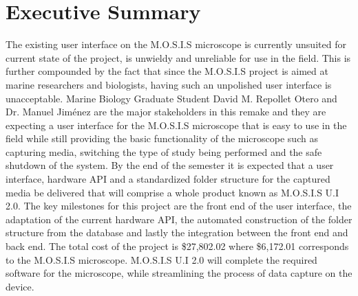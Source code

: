  \section*{Executive Summary}
 The existing user interface on the M.O.S.I.S microscope is currently unsuited for current state of the project, is unwieldy and unreliable for use in the field. This is further compounded by the fact that since the M.O.S.I.S project is aimed at marine researchers and biologists, having such an unpolished user interface is unacceptable. Marine Biology Graduate Student David M. Repollet Otero and Dr. Manuel Jiménez are the major stakeholders in this remake and they are expecting a user interface for the M.O.S.I.S microscope that is easy to use in the field while still providing the basic functionality of the microscope such as capturing media, switching the type of study being performed and the safe shutdown of the system. By the end of the semester it is expected that a user interface, hardware API and a standardized folder structure for the captured media be delivered that will comprise a whole product known as M.O.S.I.S U.I  2.0. The key milestones for this project are the front end of the user interface, the adaptation of the current hardware API, the automated construction of the folder structure from the database and lastly the integration between the front end and back end. The total cost of the project is \$27,802.02 where \$6,172.01 corresponds to the M.O.S.I.S microscope. M.O.S.I.S U.I 2.0 will complete the required software for the microscope, while streamlining the process of data capture on the device.